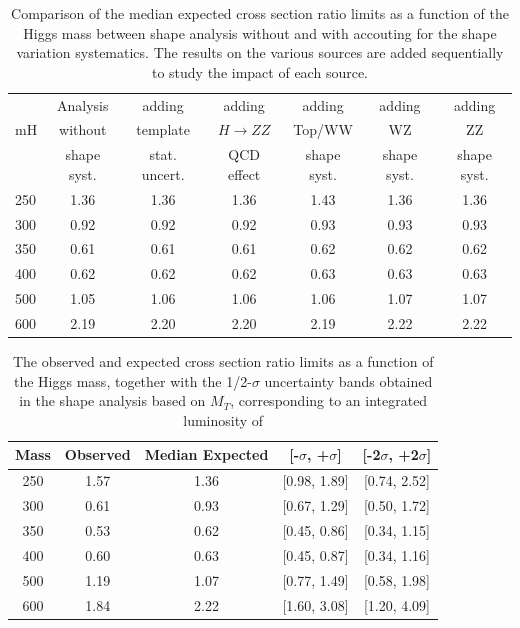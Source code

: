 \begin{table}[!ht]
\begin{center}
{\normalsize
\begin{tabular}{|l|c|ccccc|}
\hline
      &  Analysis    & adding          &  adding      &  adding      & adding      & adding \\
mH  &  without     & template        &  $H\to ZZ$   &  Top/WW             & WZ          & ZZ \\
      &  shape syst. & stat. uncert.   &  QCD effect &  shape syst. & shape syst. & shape syst. \\
\hline
250 & 1.36 & 1.36 & 1.36 & 1.43 & 1.36 & 1.36 \\   
300 & 0.92 & 0.92 & 0.92 & 0.93 & 0.93 & 0.93 \\ 
350 & 0.61 & 0.61 & 0.61 & 0.62 & 0.62 & 0.62 \\
400 & 0.62 & 0.62 & 0.62 & 0.63 & 0.63 & 0.63 \\
500 & 1.05 & 1.06 & 1.06 & 1.06 & 1.07 & 1.07 \\
600 & 2.19 & 2.20 & 2.20 & 2.19 & 2.22 & 2.22 \\
\hline
\end{tabular}
}
\caption{Comparison of the median expected cross section ratio limits as a function 
of the Higgs mass between shape analysis without and with accouting for the 
shape variation systematics. The results on the various sources are added sequentially 
to study the impact of each source. } %
\label{tab:mva_mtshape_detail}
\end{center}
\end{table}
\begin{table}[!ht]
\begin{center}
\begin{tabular}{ccccc}
\hline\hline
Mass & Observed & Median Expected & [-$\sigma$, +$\sigma$] & [-2$\sigma$, +2$\sigma$]\\\hline
250 & 1.57 & 1.36 & [0.98, 1.89] & [0.74, 2.52] \\
300 & 0.61 & 0.93 & [0.67, 1.29] & [0.50, 1.72] \\
350 & 0.53 & 0.62 & [0.45, 0.86] & [0.34, 1.15] \\
400 & 0.60 & 0.63 & [0.45, 0.87] & [0.34, 1.16] \\
500 & 1.19 & 1.07 & [0.77, 1.49] & [0.58, 1.98] \\
600 & 1.84 & 2.22 & [1.60, 3.08] & [1.20, 4.09] \\
\hline\hline
\end{tabular}
\end{center}
\caption{The observed and expected cross section ratio limits as a function 
of the Higgs mass, together with the 1/2-$\sigma$ uncertainty bands obtained in the shape analysis based on $M_T$, 
corresponding to an integrated luminosity of \intlumi}
\label{tab:limits_mtshape_5fb}
\end{table}
